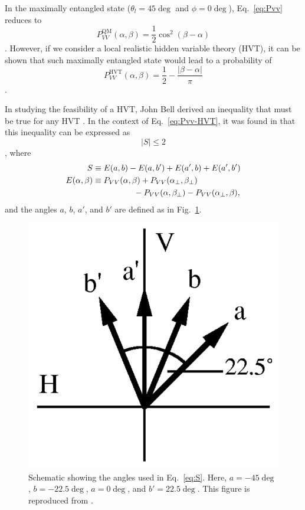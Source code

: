 \documentclass{../paper}
\newcommand{\eq}[1]{Eq.~\eqref{#1}}
\newcommand{\fig}[1]{Fig.~\ref{#1}}
\begin{document}
In the maximally entangled state ($\theta_l = 45\deg$ and $\phi = 0\deg$), \eq{eq:Pvv} reduces to
\begin{equation}\label{eq:Pvv-QM}
  P^\text{QM}_{VV}(\alpha, \beta) = \frac{1}{2} \cos^2(\beta - \alpha)
\end{equation}
\cite{Dehlinger2002}. However, if we consider a local realistic hidden variable theory (HVT), it can be shown that such maximally entangled state would lead to a probability of
\begin{equation}\label{eq:Pvv-HVT}
  P^\text{HVT}_{VV}(\alpha, \beta) = \frac{1}{2} - \frac{|\beta - \alpha|}{\pi}
\end{equation}
\cite{Dehlinger2002}.

In studying the feasibility of a HVT, John Bell derived an inequality that must be true for any HVT \cite{Bell1964}. In the context of \eq{eq:Pvv-HVT}, it was found in \cite{Clauser1969} that this inequality can be expressed as
\begin{equation}\label{eq:Bell-inequality}
  |S| \leq 2
\end{equation}
\cite{Dehlinger2002}, where
\begin{align}
  S &\equiv E(a,b) - E(a,b') + E(a',b) + E(a',b') \label{eq:S} \\
  E(\alpha,\beta) &\equiv P_{VV}(\alpha,\beta) + P_{VV}(\alpha_\perp,\beta_\perp) \label{eq:E-inP} \\
                  &\notag \qquad\qquad\quad - P_{VV}(\alpha,\beta_\perp) - P_{VV}(\alpha_\perp,\beta),
\end{align}
and the angles $a$, $b$, $a'$, and $b'$ are defined as in \fig{fig:angles}.

\begin{figure}
  \centering
  \includegraphics[width=0.6\columnwidth]{assets/angles.png}
  \caption{Schematic showing the angles used in \eq{eq:S}. Here, $a = -45\deg$, $b = -22.5\deg$, $a = 0\deg$, and $b' = 22.5\deg$. This figure is reproduced from \cite{Dehlinger2002}.}
  \label{fig:angles}
\end{figure}
\end{document}
